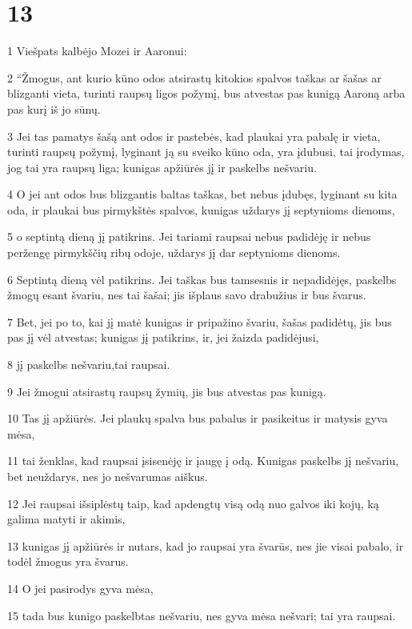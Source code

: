 \chapter{13}


\par 1 Viešpats kalbėjo Mozei ir Aaronui: 
\par 2 “Žmogus, ant kurio kūno odos atsirastų kitokios spalvos taškas ar šašas ar blizganti vieta, turinti raupsų ligos požymį, bus atvestas pas kunigą Aaroną arba pas kurį iš jo sūnų. 
\par 3 Jei tas pamatys šašą ant odos ir pastebės, kad plaukai yra pabalę ir vieta, turinti raupsų požymį, lyginant ją su sveiko kūno oda, yra įdubusi, tai įrodymas, jog tai yra raupsų liga; kunigas apžiūrės jį ir paskelbs nešvariu. 
\par 4 O jei ant odos bus blizgantis baltas taškas, bet nebus įdubęs, lyginant su kita oda, ir plaukai bus pirmykštės spalvos, kunigas uždarys jį septynioms dienoms, 
\par 5 o septintą dieną jį patikrins. Jei tariami raupsai nebus padidėję ir nebus peržengę pirmykščių ribų odoje, uždarys jį dar septynioms dienoms. 
\par 6 Septintą dieną vėl patikrins. Jei taškas bus tamsesnis ir nepadidėjęs, paskelbs žmogų esant švariu, nes tai šašai; jis išplaus savo drabužius ir bus švarus. 
\par 7 Bet, jei po to, kai jį matė kunigas ir pripažino švariu, šašas padidėtų, jis bus pas jį vėl atvestas; kunigas jį patikrins, ir, jei žaizda padidėjusi, 
\par 8 jį paskelbs nešvariu,­tai raupsai. 
\par 9 Jei žmogui atsirastų raupsų žymių, jis bus atvestas pas kunigą. 
\par 10 Tas jį apžiūrės. Jei plaukų spalva bus pabalus ir pasikeitus ir matysis gyva mėsa, 
\par 11 tai ženklas, kad raupsai įsisenėję ir įaugę į odą. Kunigas paskelbs jį nešvariu, bet neuždarys, nes jo nešvarumas aiškus. 
\par 12 Jei raupsai išsiplėstų taip, kad apdengtų visą odą nuo galvos iki kojų, ką galima matyti ir akimis, 
\par 13 kunigas jį apžiūrės ir nutars, kad jo raupsai yra švarūs, nes jie visai pabalo, ir todėl žmogus yra švarus. 
\par 14 O jei pasirodys gyva mėsa, 
\par 15 tada bus kunigo paskelbtas nešvariu, nes gyva mėsa nešvari; tai yra raupsai. 
